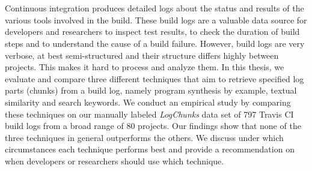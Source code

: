\documentclass[\myrootdir/main.tex]{subfiles}
\begin{document}
\chapter*{\myAbstractTitle}

Continuous integration produces detailed logs about the status and results of the various tools involved in the build.
These build logs are a valuable data source for developers and researchers to inspect test results, to check the duration of build steps and to understand the cause of a build failure.
However, build logs are very verbose, at best semi-structured and their structure differs highly between projects.
This makes it hard to process and analyze them.
In this thesis, we evaluate and compare three different techniques that aim to retrieve specified log parts (chunks) from a build log, namely program synthesis by example, textual similarity and search keywords.
We conduct an empirical study by comparing these techniques on our manually labeled \emph{LogChunks} data set of 797 Travis CI build logs from a broad range of 80 projects.
Our findings show that none of the three techniques in general outperforms the others.
We discuss under which circumstances each technique performs best and provide a recommendation on when developers or researchers should use which technique.
\end{document}
